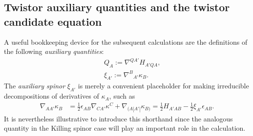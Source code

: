 \documentclass[10pt,a4paper]{article}
\theoremstyle{plain}
\begin{document}
\subsection{Twistor auxiliary quantities and the twistor candidate equation}
  
 A useful bookkeeping device for the subsequent
calculations are the definitions of the following \emph{auxiliary quantities}:
\begin{subequations}\label{def_twistor_aux_quants}
  \begin{eqnarray}
      && Q_{A}  := \nabla^{QA'}H_{A'QA}, \label{def_Q_twistor} \\
      && \xi_{A'} := \nabla^B{}_{A'}\kappa_B. \label{def_xi_twistor}
  \end{eqnarray}
\end{subequations}
  The \emph{auxiliary spinor} $\xi_{A'}$ is merely a convenient
  placeholder for making irreducible decompositions of derivatives of
  $\kappa_A$, such as
  \begin{align}\label{decomp_Der_kappa}
    \nabla_{AA'}\kappa _{B} & = \tfrac{1}{2} \epsilon _{AB}
    \nabla_{CA'}\kappa ^{C} + \nabla_{(A|A'|}\kappa _{B)} = \tfrac{1}{2} H_{A'AB} - \tfrac{1}{2} \xi _{A'} \epsilon_{AB}.
  \end{align}
It is nevertheless illustrative to introduce this
  shorthand since the analogous quantity in the Killing spinor case
  will play an important role in the calculation.

  \medskip
  
\end{document}
